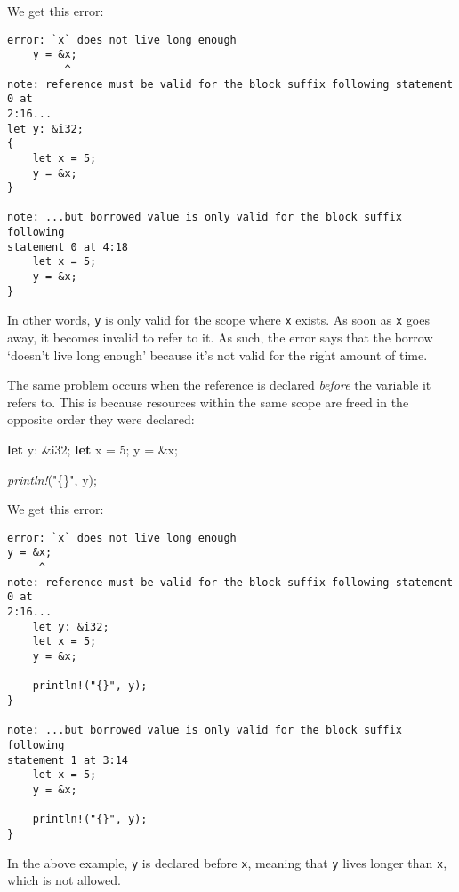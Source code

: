 \documentclass[a4paper,]{book}
\newenvironment{Shaded}{\begin{snugshade}}{\end{snugshade}}
\newcommand{\KeywordTok}[1]{\textcolor[rgb]{0.13,0.29,0.53}{\textbf{{#1}}}}
\newcommand{\DataTypeTok}[1]{\textcolor[rgb]{0.13,0.29,0.53}{{#1}}}
\newcommand{\DecValTok}[1]{\textcolor[rgb]{0.00,0.00,0.81}{{#1}}}
\newcommand{\StringTok}[1]{\textcolor[rgb]{0.31,0.60,0.02}{{#1}}}
\newcommand{\PreprocessorTok}[1]{\textcolor[rgb]{0.56,0.35,0.01}{\textit{{#1}}}}
\newcommand{\NormalTok}[1]{{#1}}
\begin{document}
We get this error:

\begin{verbatim}
error: `x` does not live long enough
    y = &x;
         ^
note: reference must be valid for the block suffix following statement 0 at
2:16...
let y: &i32;
{ 
    let x = 5;
    y = &x;
}

note: ...but borrowed value is only valid for the block suffix following
statement 0 at 4:18
    let x = 5;
    y = &x;
}
\end{verbatim}

In other words, \texttt{y} is only valid for the scope where \texttt{x}
exists. As soon as \texttt{x} goes away, it becomes invalid to refer to
it. As such, the error says that the borrow `doesn't live long enough'
because it's not valid for the right amount of time.

The same problem occurs when the reference is declared \emph{before} the
variable it refers to. This is because resources within the same scope
are freed in the opposite order they were declared:

\begin{Shaded}
\begin{Highlighting}[]
\KeywordTok{let} \NormalTok{y: &}\DataTypeTok{i32}\NormalTok{;}
\KeywordTok{let} \NormalTok{x = }\DecValTok{5}\NormalTok{;}
\NormalTok{y = &x;}

\PreprocessorTok{println!}\NormalTok{(}\StringTok{"\{\}"}\NormalTok{, y);}
\end{Highlighting}
\end{Shaded}

We get this error:

\begin{verbatim}
error: `x` does not live long enough
y = &x;
     ^
note: reference must be valid for the block suffix following statement 0 at
2:16...
    let y: &i32;
    let x = 5;
    y = &x;
    
    println!("{}", y);
}

note: ...but borrowed value is only valid for the block suffix following
statement 1 at 3:14
    let x = 5;
    y = &x;
    
    println!("{}", y);
}
\end{verbatim}

In the above example, \texttt{y} is declared before \texttt{x}, meaning
that \texttt{y} lives longer than \texttt{x}, which is not allowed.

\end{document}
